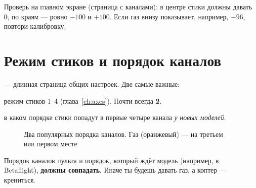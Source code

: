 \begin{tip}
Проверь на главном экране (страница с каналами): в центре стики должны давать 0, по краям ---
ровно $-100$ и $+100$. Если газ внизу показывает, например, $-96$, повтори калибровку.
\end{tip}

\section{Режим стиков и порядок каналов}

 --- длинная страница общих настроек. Две самые важные:

\begin{description}[font=\sffamily\bfseries\color{etx}]
  \item[Mode] режим стиков 1--4 (глава~\ref{ch:axes}). Почти всегда \textbf{2}.
  \item[Default channel order] в каком порядке стики попадут в первые четыре канала
        \emph{у новых моделей}.
\end{description}

\begin{figure}[H]
\centering
{}
\caption{Два популярных порядка каналов. Газ (оранжевый) --- на третьем или первом месте}
\end{figure}

\begin{note}
Порядок каналов пульта и порядок, который ждёт модель (например,  в
Betaflight), \textbf{должны совпадать}. Иначе ты будешь давать газ, а коптер --- крениться.
\end{note}

